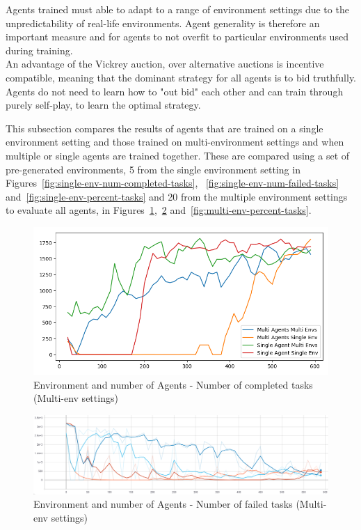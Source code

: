 Agents trained must able to adapt to a range of environment settings due to the unpredictability of real-life
environments. Agent generality is therefore an important measure and for agents to not overfit to particular
environments used during training. \\
An advantage of the Vickrey auction, over alternative auctions is incentive compatible, meaning that the dominant
strategy for all agents is to bid truthfully. Agents do not need to learn how to "out bid" each other and can train
through purely self-play, to learn the optimal strategy.

This subsection compares the results of agents that are trained on a single environment setting and those trained on
multi-environment settings and when multiple or single agents are trained together. These are compared using a set of
pre-generated environments, 5 from the single environment setting in Figures~\ref{fig:single-env-num-completed-tasks},
~\ref{fig:single-env-num-failed-tasks} and~\ref{fig:single-env-percent-tasks} and 20 from the multiple environment
settings to evaluate all agents, in Figures~\ref{fig:multi-env-num-completed-tasks},~\ref{fig:multi-env-num-failed-tasks}
and~\ref{fig:multi-env-percent-tasks}.

\begin{figure}[H]
    \centering
    \includegraphics[width=\linewidth]{figures/5_evaluation_figs/env_agent_num_training_fig/num_completed_tasks.png}
    \caption{Environment and number of Agents - Number of completed tasks (Multi-env settings)}
    \label{fig:multi-env-num-completed-tasks}
\end{figure}

\begin{figure}[H]
    \centering
    \includegraphics[width=\linewidth]{figures/5_evaluation_figs/env_agent_num_training_fig/num_failed_tasks.png}
    \caption{Environment and number of Agents - Number of failed tasks (Multi-env settings)}
    \label{fig:multi-env-num-failed-tasks}
\end{figure}

